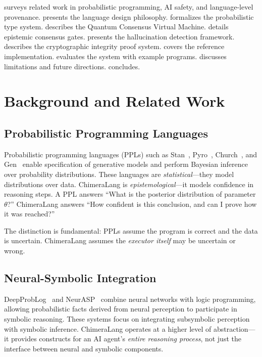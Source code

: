 \documentclass[11pt,a4paper]{article}
\begin{document}
 surveys related work in probabilistic programming,
AI safety, and language-level provenance.
 presents the language design philosophy.
 formalizes the probabilistic type system.
 describes the Quantum Consensus Virtual Machine.
 details epistemic consensus gates.
 presents the hallucination detection framework.
 describes the cryptographic integrity proof system.
 covers the reference implementation.
 evaluates the system with example programs.
 discusses limitations and future directions.
 concludes.

\section{Background and Related Work}
\label{sec:background}

\subsection{Probabilistic Programming Languages}

Probabilistic programming languages (PPLs) such as
Stan~\cite{carpenter2017stan}, Pyro~\cite{bingham2019pyro},
Church~\cite{goodman2008church}, and Gen~\cite{cusumano2019gen} enable
specification of generative models and perform Bayesian inference over
probability distributions. These languages are \emph{statistical}---they model
distributions over data. ChimeraLang is \emph{epistemological}---it models
confidence in reasoning steps. A PPL answers ``What is the posterior distribution
of parameter $\theta$?'' ChimeraLang answers ``How confident is this conclusion,
and can I prove how it was reached?''

The distinction is fundamental: PPLs assume the program is correct and the data
is uncertain. ChimeraLang assumes the \emph{executor itself} may be uncertain or
wrong.

\subsection{Neural-Symbolic Integration}

DeepProbLog~\cite{manhaeve2018deepproblog} and NeurASP~\cite{yang2020neurasp}
combine neural networks with logic programming, allowing probabilistic facts
derived from neural perception to participate in symbolic reasoning. These
systems focus on integrating subsymbolic perception with symbolic inference.
ChimeraLang operates at a higher level of abstraction---it provides constructs
for an AI agent's \emph{entire reasoning process}, not just the interface between
neural and symbolic components.
\end{document}
